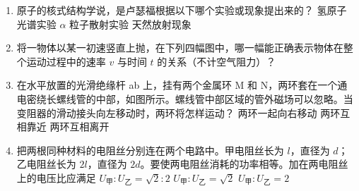 \documentclass[\gkver]{gaokaozhenti}
\begin{document}
\begin{enumerate}

\item
原子的核式结构学说，是卢瑟福根据以下哪个实验或现象提出来的？
{氢原子光谱实验}
{$\alpha$ 粒子散射实验}
{天然放射现象}


\item
将一物体以某一初速竖直上抛，在下列四幅图中，哪一幅能正确表示物体在整个运动过程中的速率 $v$ 与时间 $t$ 的关系（不计空气阻力）？
\fourchoices[answer=B, ispicture=true, h=2.6cm]
{}
{}
{}
{}


\item
在水平放置的光滑绝缘杆 ab 上，挂有两个金属环 M 和 N，两环套在一个通电密绕长螺线管的中部，如图所示。螺线管中部区域的管外磁场可以忽略。当变阻器的滑动接头向左移动时，两环将怎样运动？
\onepicture{}
{两环一起向右移动}
{两环互相靠近}
{两环互相离开}


\item
把两根同种材料的电阻丝分别连在两个电路中。甲电阻丝长为 $l$，直径为 $d$；乙电阻丝长为 $2l$，直径为 $2d$。要使两电阻丝消耗的功率相等。加在两电阻丝上的电压比应满足
{$U_{\text{甲}}:U_{\text{乙}}=\sqrt{2}:2$}
{$U_{\text{甲}}:U_{\text{乙}}=\sqrt{2}$}
{$U_{\text{甲}}:U_{\text{乙}}=2$}


\end{enumerate}
\end{document}
